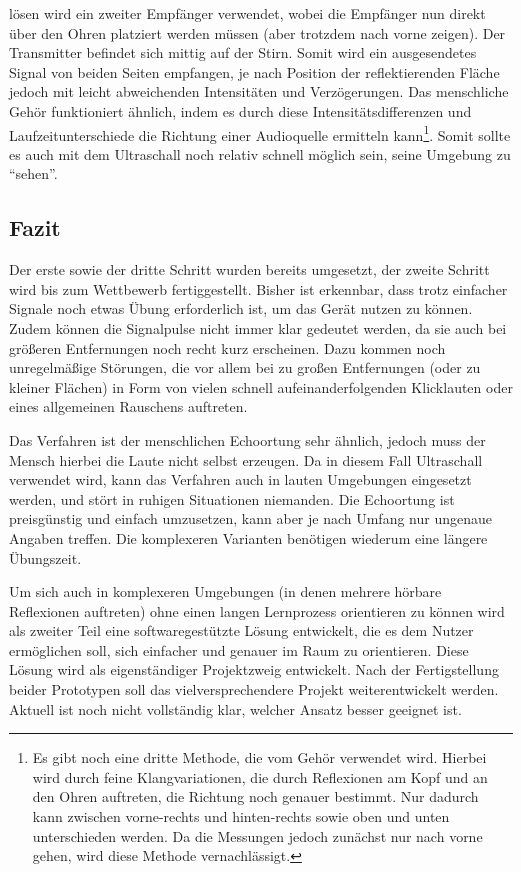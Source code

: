 \documentclass[a4paper,12pt,ngerman]{scrartcl}
\begin{document}
lösen wird ein zweiter Empfänger verwendet, wobei die Empfänger nun direkt über den Ohren 
platziert werden müssen (aber trotzdem nach vorne zeigen). Der Transmitter befindet sich 
mittig auf der Stirn. Somit wird ein ausgesendetes Signal von beiden Seiten empfangen, je 
nach Position der reflektierenden Fläche jedoch mit leicht abweichenden Intensitäten und 
Verzögerungen. Das menschliche Gehör funktioniert ähnlich, indem es durch diese 
Intensitätsdifferenzen und Laufzeitunterschiede die Richtung einer Audioquelle ermitteln 
kann\footnote{Es gibt noch eine dritte Methode, die vom Gehör verwendet wird. Hierbei wird 
durch feine Klangvariationen, die durch Reflexionen am Kopf und an den Ohren auftreten, die 
Richtung noch genauer bestimmt. Nur dadurch kann zwischen vorne-rechts und hinten-rechts 
sowie oben und unten unterschieden werden. Da die Messungen jedoch zunächst nur nach vorne 
gehen, wird diese Methode vernachlässigt.}. Somit sollte es auch mit dem Ultraschall noch 
relativ schnell möglich sein, seine Umgebung zu \enquote{sehen}.

\subsection{Fazit}

Der erste sowie der dritte Schritt wurden bereits umgesetzt, der zweite Schritt wird bis 
zum Wettbewerb fertiggestellt. Bisher ist erkennbar, dass trotz einfacher Signale noch 
etwas Übung erforderlich ist, um das Gerät nutzen zu können. Zudem können die Signalpulse 
nicht immer klar gedeutet werden, da sie auch bei größeren Entfernungen noch recht kurz 
erscheinen. Dazu kommen noch unregelmäßige Störungen, die vor allem bei zu großen 
Entfernungen (oder zu kleiner Flächen) in Form von vielen schnell aufeinanderfolgenden 
Klicklauten oder eines allgemeinen Rauschens auftreten. \par
Das Verfahren ist der menschlichen Echoortung sehr ähnlich, jedoch muss der Mensch hierbei 
die Laute nicht selbst erzeugen. Da in diesem Fall Ultraschall verwendet wird, kann das 
Verfahren auch in lauten Umgebungen eingesetzt werden, und stört in ruhigen Situationen 
niemanden. Die Echoortung ist preisgünstig und einfach umzusetzen, kann aber je nach 
Umfang nur ungenaue Angaben treffen. Die komplexeren Varianten benötigen wiederum eine 
längere Übungszeit. \par
Um sich auch in komplexeren Umgebungen (in denen mehrere hörbare Reflexionen auftreten)
ohne einen langen Lernprozess orientieren zu können wird als zweiter Teil eine
softwaregestützte Lösung entwickelt, die es dem Nutzer ermöglichen soll, sich einfacher
und genauer im Raum zu orientieren. Diese Lösung wird als eigenständiger Projektzweig 
entwickelt. Nach der Fertigstellung beider Prototypen soll das vielversprechendere Projekt 
weiterentwickelt werden. Aktuell ist noch nicht vollständig klar, welcher Ansatz besser 
geeignet ist.
\end{document}
